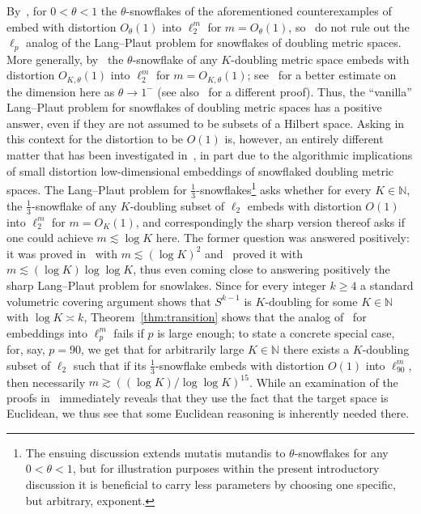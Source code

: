 \documentclass[11pt,reqno]{amsart}
\newcommand{\N}{\mathbb{N}}
\renewcommand{\ge}{\geqslant}
\newcommand{\1}{\mathbf{1}}
\begin{document}
By~\cite{Assouad}, for $0<\theta<1$ the $\theta$-snowflakes of the aforementioned counterexamples of~\cite{BGN14,LN} embed with distortion $O_{\theta}(1)$ into $\ell_2^m$ for $m=O_\theta(1)$, so~\cite{BGN14,LN} do not rule out  the $\ell_p$ analog of the Lang--Plaut problem for snowflakes of doubling metric spaces.  More generally,  by~\cite{Assouad} the $\theta$-snowflake of any $K$-doubling metric space embeds with distortion $O_{K,\theta}(1)$ into $\ell_2^m$ for $m=O_{K,\theta}(1)$; see~\cite{NN} for a better estimate on the dimension here as $\theta\to 1^-$ (see also~\cite{DS13} for a different proof). Thus, the ``vanilla'' Lang--Plaut problem for snowflakes of doubling metric spaces has a positive answer, even if they are not assumed  to be subsets of a Hilbert space. Asking in this context for the distortion to be $O(1)$ is, however,  an entirely different matter that has been  investigated in~\cite{HM05,ABN08,GK,BRS,Nei16,BG16}, in part due to the algorithmic implications of  small distortion low-dimensional embeddings of snowflaked doubling  metric spaces.  The Lang--Plaut problem for $\frac13$-snowflakes\footnote{The ensuing discussion extends mutatis mutandis to $\theta$-snowflakes for any $0<\theta<1$, but for illustration purposes within the present introductory discussion it is beneficial to carry less parameters by choosing one specific, but arbitrary, exponent.} asks whether for every $K\in \N$, the $\frac13$-snowflake of any $K$-doubling subset of $\ell_2$ embeds with distortion $O(1)$ into $\ell_2^m$ for $m=O_{K}(1)$, and correspondingly the sharp version thereof asks if one could achieve $m\lesssim \log K$ here. The former question was answered positively: it was proved in~\cite{GK}  with $m\lesssim (\log K)^2$ and~\cite{BRS} proved it with $m\lesssim (\log K)\log\log K$, thus even coming close to answering positively the sharp Lang--Plaut problem for snowlakes. Since for every integer $k\ge 4$ a standard volumetric covering argument shows that $S^{k-1}$ is $K$-doubling for some $K\in \N$ with $\log K\asymp k$,  Theorem~\ref{thm:transition}  shows that the analog of~\cite{BG,BRS} for embeddings into $\ell_p^m$ fails if $p$ is large enough; to state a concrete special case, for, say, $p=90$, we get that for arbitrarily large $K\in \N$ there exists a $K$-doubling subset of $\ell_2$ such that if its $\frac13$-snowflake embeds with distortion $O(1)$ into $\ell_{90}^m$, then necessarily $m\gtrsim ((\log K)/\log\log K)^{15}$. While an examination of the proofs in~\cite{BG,BRS} immediately  reveals that they use the fact that the target space is Euclidean, we thus see that some Euclidean reasoning is inherently needed there. 
\end{document}
